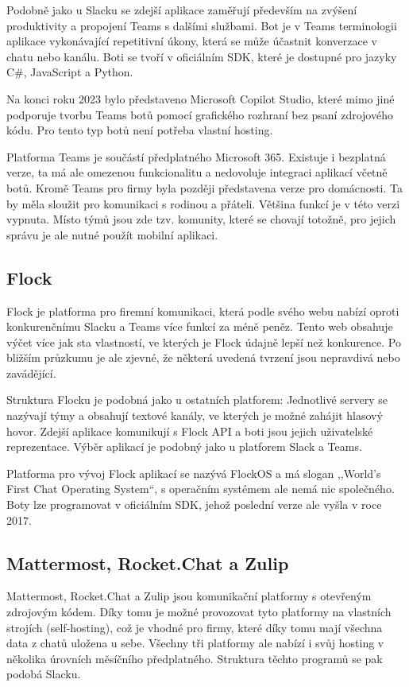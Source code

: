 \documentclass[FM]{tulthesis}
\begin{document}
	Podobně jako u Slacku se zdejší aplikace zaměřují především na zvýšení produktivity a propojení Teams s dalšími službami. Bot je v Teams terminologii aplikace vykonávající repetitivní úkony, která se může účastnit konverzace v chatu nebo kanálu. Boti se tvoří v oficiálním SDK, které je dostupné pro jazyky C\#, JavaScript a Python.
	
	Na konci roku 2023 bylo představeno Microsoft Copilot Studio, které mimo jiné podporuje tvorbu Teams botů pomocí grafického rozhraní bez psaní zdrojového kódu. Pro tento typ botů není potřeba vlastní hosting.
	
	Platforma Teams je součástí předplatného Microsoft 365. Existuje i bezplatná verze, ta má ale omezenou funkcionalitu a nedovoluje integraci aplikací včetně botů. Kromě Teams pro firmy byla později představena verze pro domácnosti. Ta by měla sloužit pro komunikaci s rodinou a přáteli. Většina funkcí je v této verzi vypnuta. Místo týmů jsou zde tzv. komunity, které se chovají totožně, pro jejich správu je ale nutné použít mobilní aplikaci.
	
	\subsection{Flock}
	
	Flock je platforma pro firemní komunikaci, která podle svého webu nabízí oproti konkurenčnímu Slacku a Teams více funkcí za méně peněz. Tento web obsahuje výčet více jak sta vlastností, ve kterých je Flock údajně lepší než konkurence. Po bližším průzkumu je ale zjevné, že některá uvedená tvrzení jsou nepravdivá nebo zavádějící.
	
	Struktura Flocku je podobná jako u ostatních platforem: Jednotlivé servery se nazývají týmy a obsahují textové kanály, ve kterých je možné zahájit hlasový hovor. Zdejší aplikace komunikují s Flock API a boti jsou jejich uživatelské reprezentace. Výběr aplikací je podobný jako u platforem Slack a Teams.
	
	Platforma pro vývoj Flock aplikací se nazývá FlockOS a má slogan ,,World's First Chat Operating System``, s operačním systémem ale nemá nic společného. Boty lze programovat v oficiálním SDK, jehož poslední verze ale vyšla v roce 2017.
	
	\subsection{Mattermost, Rocket.Chat a Zulip}
	
	Mattermost, Rocket.Chat a Zulip jsou komunikační platformy s otevřeným zdrojovým kódem. Díky tomu je možné provozovat tyto platformy na vlastních strojích (self-hosting), což je vhodné pro firmy, které díky tomu mají všechna data z chatů uložena u sebe. Všechny tři platformy ale nabízí i svůj hosting v několika úrovních měsíčního předplatného. Struktura těchto programů se pak podobá Slacku.
	
\end{document}
